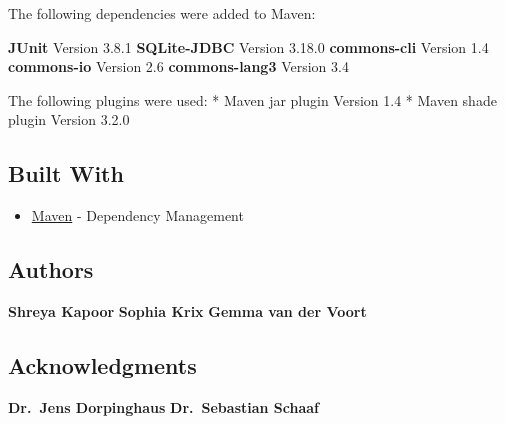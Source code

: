 The following dependencies were added to Maven:

\textbf{JUnit} Version 3.8.1 \textbf{SQLite-JDBC} Version 3.18.0
\textbf{commons-cli} Version 1.4 \textbf{commons-io} Version 2.6
\textbf{commons-lang3} Version 3.4

The following plugins were used: * Maven jar plugin Version 1.4 * Maven
shade plugin Version 3.2.0

\hypertarget{built-with}{%
\subsection{Built With}\label{built-with}}

\begin{itemize}
\tightlist
\item
  \href{https://maven.apache.org/}{Maven} - Dependency Management
\end{itemize}

\hypertarget{authors}{%
\subsection{Authors}\label{authors}}

\textbf{Shreya Kapoor} \textbf{Sophia Krix} \textbf{Gemma van der Voort}

\hypertarget{acknowledgments}{%
\subsection{Acknowledgments}\label{acknowledgments}}

\textbf{Dr.~Jens Dorpinghaus} \textbf{Dr.~Sebastian Schaaf}

